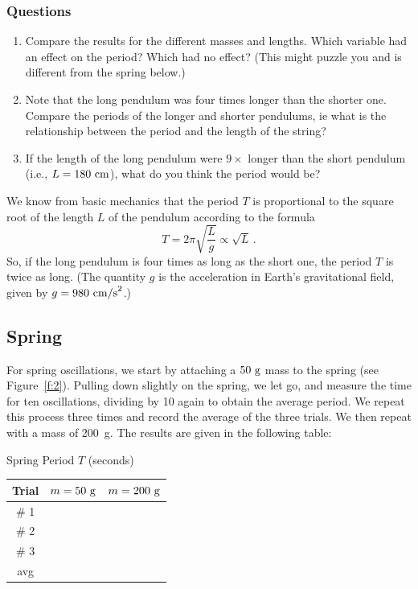 \documentclass[11pt]{NSF}
\def\be{\begin{equation}}
\def\ee{\end{equation}}
\def\ben{\begin{enumerate}}
\def\een{\end{enumerate}}
\def\i{\item{}}
\begin{document}
\subsubsection*{Questions}
%
\ben
\i Compare the results for the different masses and lengths. 
Which variable had an effect on the period? Which had no effect? 
(This might puzzle you and is different from the spring below.)

\i Note that the long pendulum was four times longer than the shorter one. 
Compare the periods of the longer and shorter pendulums, ie what is the relationship between the period and the length of the string?

\i If the length of the long pendulum were $9\times$ longer 
than the short pendulum (i.e., $L=180~{\rm cm}$), what do you think
the period would be?
\een

We know from basic mechanics that the period $T$ is proportional 
to the square root of the length $L$ of the pendulum according to the formula
\be
T=2\pi\sqrt{\frac{L}{g}}\propto \sqrt{L}\,.
\ee
So, if the long pendulum is four times as long as the short one, 
the period $T$ is twice as long. 
(The quantity $g$ is the acceleration in Earth’s gravitational field, 
given by $g = 980~{\rm cm/s}^2$.)

\subsection{Spring}

For spring oscillations, we start by attaching a 
$50~{\rm g}$ mass to the spring (see Figure~\ref{f:2}).
Pulling down slightly on the spring, we let go, and measure the time for ten 
oscillations, dividing by 10 again to obtain the average period.
We repeat this process three times and record the average of the three trials.
We then repeat with a mass of 200~g.
The results are given in the following table:
%
\begin{table}[hbtp]
\begin{center}
Spring Period $T$ (seconds)\\
\begin{tabular}{| c | c | c | }
\hline
Trial & $m=50~{\rm g}$ & $m=200~{\rm g}$ \\
\hline
\# 1 &  &  \\
\hline
\# 2 &  &  \\
\hline
\# 3 &  &  \\
\hline
avg  &  &  \\
\hline
\end{tabular}
\label{t:2}
\end{center}
\end{table}
%
\end{document}
